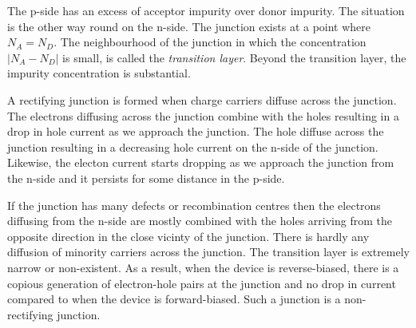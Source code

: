 The p-side has an excess of acceptor impurity over donor impurity. The situation
is the other way round on the n-side. The junction exists at a point where 
$N_A = N_D$. The neighbourhood of the junction in which the concentration 
$|N_A - N_D|$ is small, is called the \emph{transition layer}. Beyond the 
transition layer, the impurity concentration is substantial. 

A rectifying junction is formed when charge carriers diffuse across the 
junction. The electrons diffusing across the junction combine with the holes
resulting in a drop in hole current as we approach the junction. The hole
diffuse across the junction resulting in a decreasing hole current on the
n-side of the junction. Likewise, the electon current starts dropping as we
approach the junction from the n-side and it persists for some distance in the
p-side.

If the junction has many defects or recombination centres then the electrons
diffusing from the n-side are mostly combined with the holes arriving from the
opposite direction in the close vicinty of the junction. There is hardly any
diffusion of minority carriers across the junction. The transition layer is
extremely narrow or non-existent. As a result, when the device is 
reverse-biased, there is a copious generation of electron-hole pairs at the
junction and no drop in current compared to when the device is forward-biased.
Such a junction is a non-rectifying junction.

